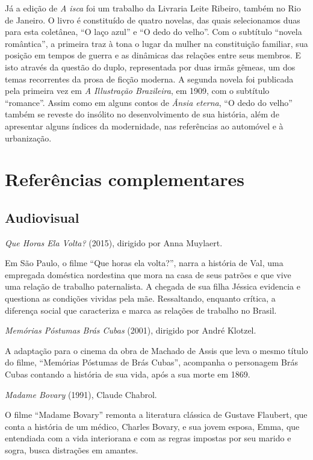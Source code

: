 \documentclass[12pt]{extarticle}
\begin{document}
Já a edição de \emph{A isca} foi um trabalho da Livraria Leite Ribeiro,
também no Rio de Janeiro. O livro é constituído de quatro novelas, das
quais selecionamos duas para esta coletânea, ``O laço azul'' e ``O dedo
do velho''. Com o subtítulo ``novela romântica'', a primeira traz à tona
o lugar da mulher na constituição familiar, sua posição em tempos de
guerra e as dinâmicas das relações entre seus membros. E isto através da
questão do duplo, representada por duas irmãs gêmeas, um dos temas
recorrentes da prosa de ficção moderna. A segunda novela foi publicada
pela primeira vez em \emph{A Illustração Brazileira}, em 1909, com o
subtítulo ``romance''. Assim como em alguns contos de \emph{Ânsia
eterna}, ``O dedo do velho'' também se reveste do insólito no
desenvolvimento de sua história, além de apresentar alguns índices da
modernidade, nas referências ao automóvel e à urbanização.

\section{Referências complementares}

\subsection{Audiovisual}

\emph{Que Horas Ela Volta?} (2015), dirigido por Anna Muylaert.

Em São Paulo, o filme ``Que horas ela volta?'', narra a história de Val, 
uma empregada doméstica nordestina que mora na casa de seus patrões e 
que vive uma relação de trabalho paternalista. A chegada de sua filha 
Jéssica evidencia e questiona as condições vividas pela mãe. Ressaltando, 
enquanto crítica, a diferença social que caracteriza e marca as relações 
de trabalho no Brasil. 

\emph{Memórias Póstumas Brás Cubas} (2001), dirigido por André Klotzel.
 
A adaptação para o cinema da obra de Machado de Assis que leva o mesmo título 
do filme, ``Memórias Póstumas de Brás Cubas'', acompanha o personagem Brás Cubas 
contando a história de sua vida, após a sua morte em 1869.

\emph{Madame Bovary} (1991), Claude Chabrol.

O filme ``Madame Bovary'' remonta a literatura clássica de Gustave Flaubert, que conta 
a história de um médico, Charles Bovary, e sua jovem esposa, Emma, que entendiada com a 
vida interiorana e com as regras impostas por seu marido e sogra, busca distrações em 
amantes.
\end{document}
